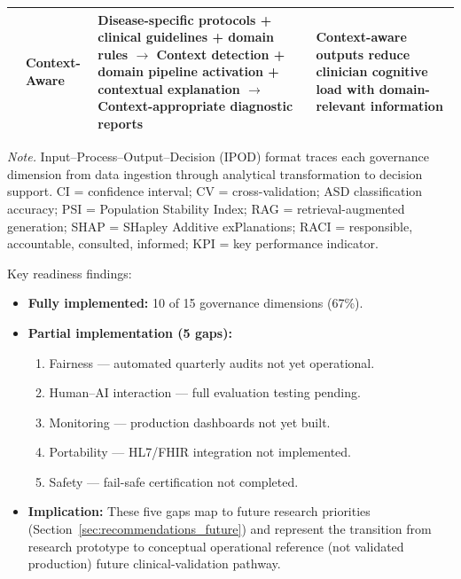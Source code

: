 \begin{table}[!htbp]
\begin{tabularx}{\textwidth}{@{} p{0.4cm} p{1.5cm} L L @{}}
 & Context-Aware & Disease-specific protocols + clinical guidelines + domain rules $\to$ Context detection + domain pipeline activation + contextual explanation $\to$ Context-appropriate diagnostic reports & Context-aware outputs reduce clinician cognitive load with domain-relevant information \\
\bottomrule
\end{tabularx}
\vspace{0.5em}\noindent\textit{Note.} Input--Process--Output--Decision (IPOD) format traces each governance dimension from data ingestion through analytical transformation to decision support. CI = confidence interval; CV = cross-validation; ASD classification accuracy; PSI = Population Stability Index; RAG = retrieval-augmented generation; SHAP = SHapley Additive exPlanations; RACI = responsible, accountable, consulted, informed; KPI = key performance indicator.
\end{table}
\fi

Key readiness findings:

\begin{itemize}
    \item \textbf{Fully implemented:} 10 of 15 governance dimensions (67\%).
    \item \textbf{Partial implementation (5 gaps):}
    \begin{enumerate}
        \item Fairness --- automated quarterly audits not yet operational.
        \item Human--AI interaction --- full evaluation testing pending.
        \item Monitoring --- production dashboards not yet built.
        \item Portability --- HL7/FHIR integration not implemented.
        \item Safety --- fail-safe certification not completed.
    \end{enumerate}
    \item \textbf{Implication:} These five gaps map to future research priorities (Section~\ref{sec:recommendations_future}) and represent the transition from research prototype to conceptual operational reference (not validated production) future clinical-validation pathway.
\end{itemize}

